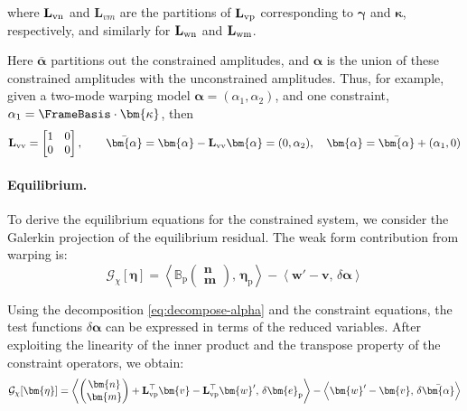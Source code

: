 %
where \(\mathbf{L}_{\rm vn}\) and \(\mathbf{L}_{vm}\) are the partitions of \(\mathbf{L}_{\rm vp}\) corresponding to \(\bm{\gamma}\) and \(\bm{\kappa}\), respectively, and similarly for \(\mathbf{L}_{\rm wn}\) and \(\mathbf{L}_{\rm wm}\).
\begin{remark}
Here $\bar{\bm{\alpha}}$ partitions out the constrained amplitudes, and $\bm{\alpha}$ is the union of these constrained amplitudes with the unconstrained amplitudes. Thus, for example, given a two-mode warping model $\bm{\alpha} = (\alpha_1, \alpha_2)$, and one constraint, $\alpha_1 = \FrameBasis\cdot\bm{\kappa}$,
then \[
\mathbf{L}_{\rm vv} = \begin{bmatrix}
1 & 0 \\ 0 & 0
\end{bmatrix},
\qquad
\bar{\bm{\alpha}} = \bm{\alpha} - \mathbf{L}_{\rm vv}\bm{\alpha} = (0, \alpha_2),
\quad 
\bm{\alpha} = \bar{\bm{\alpha}} + (\alpha_1, 0)
\]
\end{remark}

\paragraph{Equilibrium.}

To derive the equilibrium equations for the constrained system, we consider the Galerkin projection of the equilibrium residual. The weak form contribution from warping is:
\begin{equation*}
\mathcal{G}_{\chi}[\bm{\eta}] = \left< \mathbb{B}_{\mathrm{p}} \begin{pmatrix} \bm{n} \\ \bm{m} \end{pmatrix} ,\, \bm{\eta}_{\mathrm{p}} \right>
-\left< \bm{w}'-\bm{v},\, \delta\bm{\alpha} \right>
\end{equation*}

Using the decomposition \eqref{eq:decompose-alpha} and the constraint equations, the test functions \(\delta\bm{\alpha}\) can be expressed in terms of the reduced variables. 
After exploiting the linearity of the inner product and the transpose property of the constraint operators, we obtain:
\begin{equation*}
\mathcal{G}_{\chi}[\bm{\eta}] = 
\left<\begin{pmatrix} \bm{n} \\ \bm{m} \end{pmatrix} + \mathbf{L}_{\rm vp}^{\top}\bm{v} - \mathbf{L}_{\rm vp}^{\top}\bm{w}' ,\, \delta \bm{e}_{\mathrm{p}} \right>
-\left< \bm{w}'-\bm{v} ,\, \delta \bar{\bm{\alpha}} \right>
\end{equation*}

